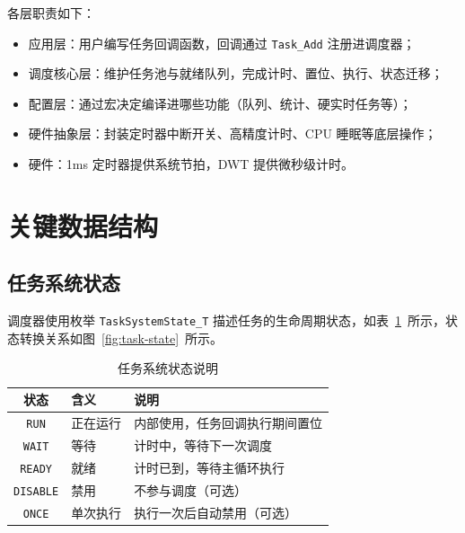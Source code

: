 各层职责如下：

\begin{itemize}
\item 应用层：用户编写任务回调函数，回调通过 \texttt{Task\_Add} 注册进调度器；
\item 调度核心层：维护任务池与就绪队列，完成计时、置位、执行、状态迁移；
\item 配置层：通过宏决定编译进哪些功能（队列、统计、硬实时任务等）；
\item 硬件抽象层：封装定时器中断开关、高精度计时、CPU 睡眠等底层操作；
\item 硬件：1ms 定时器提供系统节拍，DWT 提供微秒级计时。
\end{itemize}

\section{关键数据结构}

\subsection{任务系统状态}

调度器使用枚举 \texttt{TaskSystemState\_T} 描述任务的生命周期状态，如表~\ref{tab:task-state}~所示，状态转换关系如图~\ref{fig:task-state}~所示。

\begin{table}[htbp]
\centering \caption{任务系统状态说明} \label{tab:task-state}
    \begin{tabular}{cll}
        \toprule
        状态 & 含义 & 说明 \\
        \midrule
        \texttt{RUN}     & 正在运行  & 内部使用，任务回调执行期间置位 \\
        \texttt{WAIT}    & 等待      & 计时中，等待下一次调度 \\
        \texttt{READY}   & 就绪      & 计时已到，等待主循环执行 \\
        \texttt{DISABLE} & 禁用      & 不参与调度（可选） \\
        \texttt{ONCE}    & 单次执行  & 执行一次后自动禁用（可选） \\
        \bottomrule
    \end{tabular}
\end{table}

